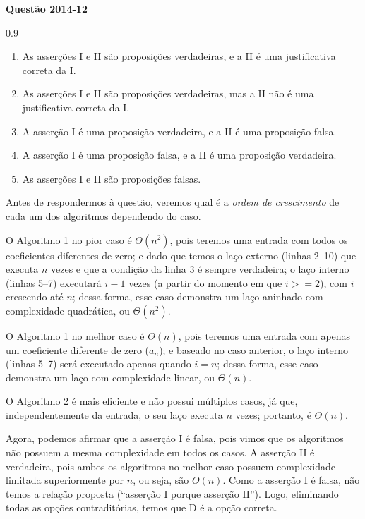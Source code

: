 \documentclass[12pt,a4paper]{article}
\newenvironment{question}[1]{%
    \pdfbookmark[3]{Questão #1}{q:#1}
    \label{q:#1}
    \bigskip\par\noindent
    \textbf{Questão #1} \dotfill
    \medskip\par\nopagebreak\noindent
    \ignorespaces
}{%
    \noindent\dotfill\medskip
}
\begin{document}
\begin{question}{2014-12}
\begin{spacing}{0.9}
\begin{small}
\begin{enumerate}[label=\Alph*)]
    \item As asserções I e II são proposições verdadeiras, e a II é uma justificativa correta da I.
    \item As asserções I e II são proposições verdadeiras, mas a II não é uma justificativa correta da I.
    \item A asserção I é uma proposição verdadeira, e a II é uma proposição falsa.
    \item A asserção I é uma proposição falsa, e a II é uma proposição verdadeira.
    \item As asserções I e II são proposições falsas.
\end{enumerate}
\end{small}
\end{spacing}
\end{question}

Antes de respondermos à questão, veremos qual é a \emph{ordem de crescimento} de cada um dos algoritmos dependendo do caso.

O Algoritmo 1 no pior caso é $\Theta(n^2)$, pois teremos uma entrada com todos os coeficientes diferentes de zero;
e dado que temos o laço externo (linhas 2--10) que executa $n$ vezes e que a condição da linha 3 é sempre verdadeira;
o laço interno (linhas 5--7) executará $i - 1$ vezes (a partir do momento em que $i >= 2$), com $i$ crescendo até $n$;
dessa forma, esse caso demonstra um laço aninhado com complexidade quadrática, ou $\Theta(n^2)$.

O Algoritmo 1 no melhor caso é $\Theta(n)$, pois teremos uma entrada com apenas um coeficiente diferente de zero ($a_n$);
e baseado no caso anterior, o laço interno (linhas 5--7) será executado apenas quando $i = n$;
dessa forma, esse caso demonstra um laço com complexidade linear, ou $\Theta(n)$.

O Algoritmo 2 é mais eficiente e não possui múltiplos casos, já que, independentemente da entrada,
o seu laço executa $n$ vezes; portanto, é $\Theta(n)$.

Agora, podemos afirmar que a asserção I é falsa,
pois vimos que os algoritmos não possuem a mesma complexidade em todos os casos.
A asserção II é verdadeira, pois ambos os algoritmos no melhor caso possuem complexidade limitada superiormente por $n$, ou seja, são $O(n)$.
Como a asserção I é falsa, não temos a relação proposta (``asserção I porque asserção II'').
Logo, eliminando todas as opções contraditórias, temos que D é a opção correta.
\end{document}
